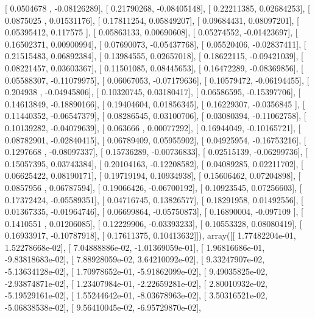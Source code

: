 \documentclass{article}
\begin{document}
       [ 0.0504678 , -0.08126289],
       [ 0.21790268, -0.08405148],
       [ 0.22211385,  0.02684253],
       [ 0.0875025 ,  0.01531176],
       [ 0.17811254,  0.05849207],
       [ 0.09684431,  0.08097201],
       [ 0.05395412,  0.117575  ],
       [ 0.05863133,  0.00690608],
       [ 0.05274552, -0.01423697],
       [ 0.16502371,  0.00900994],
       [ 0.07690073, -0.05437768],
       [ 0.05520406, -0.02837411],
       [ 0.21515483,  0.06892384],
       [ 0.13984555,  0.02657018],
       [ 0.18622115, -0.09421039],
       [ 0.08221457,  0.03603367],
       [ 0.11501085,  0.08445653],
       [ 0.16472289, -0.08369856],
       [ 0.05588307, -0.11079975],
       [ 0.06067053, -0.07179636],
       [ 0.10579472, -0.06194455],
       [ 0.204938  , -0.04945806],
       [ 0.10320745,  0.03180417],
       [ 0.06586595, -0.15397706],
       [ 0.14613849, -0.18890166],
       [ 0.19404604,  0.01856345],
       [ 0.16229307, -0.0356845 ],
       [ 0.11440352, -0.06547379],
       [ 0.08286545,  0.03100706],
       [ 0.03080394, -0.11062758],
       [ 0.10139282, -0.04079639],
       [ 0.063666  ,  0.00077292],
       [ 0.16944049, -0.10165721],
       [ 0.08782901, -0.02840415],
       [ 0.06789409,  0.05955902],
       [ 0.04925954, -0.16753216],
       [ 0.1297668 , -0.08097337],
       [ 0.15736289, -0.00736833],
       [ 0.02515139, -0.06299736],
       [ 0.15057395,  0.03743384],
       [ 0.20104163, -0.12208582],
       [ 0.04089285,  0.02211702],
       [ 0.06625422,  0.08190171],
       [ 0.19719194,  0.10934938],
       [ 0.15606462,  0.07204898],
       [ 0.0857956 ,  0.06787594],
       [ 0.19066426, -0.06700192],
       [ 0.10923545,  0.07256603],
       [ 0.17372424, -0.05589351],
       [ 0.04716745,  0.13826577],
       [ 0.18291958,  0.01492556],
       [ 0.01367335, -0.01964746],
       [ 0.06699864, -0.05750873],
       [ 0.16890004, -0.097109  ],
       [ 0.1410551 ,  0.01206085],
       [ 0.12229906, -0.03393233],
       [ 0.10553328,  0.08080419],
       [ 0.16933917, -0.10787918],
       [ 0.17611375,  0.10413632]]), array([[  1.77482204e-01,   1.52278668e-02],
       [  7.04888886e-02,  -1.01369059e-01],
       [  1.96816686e-01,  -9.83818683e-02],
       [  7.88928059e-02,   3.64210092e-02],
       [  9.33247907e-02,  -5.13634128e-02],
       [  1.70978652e-01,  -5.91862099e-02],
       [  9.49035825e-02,  -2.93874871e-02],
       [  1.23407984e-01,  -2.22659281e-02],
       [  2.80010932e-02,  -5.19529161e-02],
       [  1.55244642e-01,  -8.03678963e-02],
       [  3.50316521e-02,  -5.06838538e-02],
       [  9.56410045e-02,  -6.95729870e-02],
\end{document}

